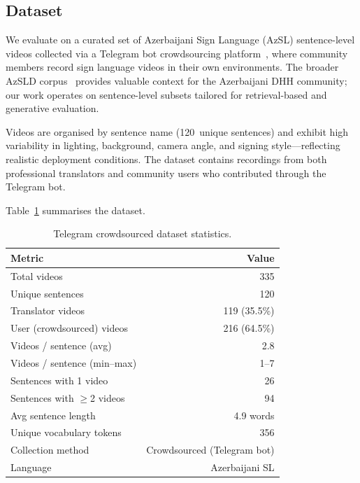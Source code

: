 \documentclass[runningheads]{llncs}
\begin{document}
\subsection{Dataset}\label{sec:dataset}

We evaluate on a curated set of Azerbaijani Sign Language (AzSL)
sentence-level videos collected via a Telegram bot crowdsourcing
platform~\cite{mustafazada2025crowdsourcing}, where community
members record sign language videos in their own environments.
The broader AzSLD corpus~\cite{alishzade2024azsld} provides valuable
context for the Azerbaijani DHH community; our work operates on
sentence-level subsets tailored for retrieval-based and generative
evaluation.

Videos are organised by sentence name (120~unique sentences) and
exhibit high variability in lighting, background, camera angle, and
signing style—reflecting realistic deployment conditions.
The dataset contains recordings from both professional translators
and community users who contributed through the Telegram bot.

Table~\ref{tab:dataset} summarises the dataset.

\begin{table}[t]
\centering
\caption{Telegram crowdsourced dataset statistics.}
\label{tab:dataset}
\begin{tabular}{@{}lr@{}}
\toprule
Metric & Value \\
\midrule
Total videos                & 335 \\
Unique sentences            & 120 \\
Translator videos           & 119 (35.5\%) \\
User (crowdsourced) videos  & 216 (64.5\%) \\
Videos / sentence (avg)     & 2.8 \\
Videos / sentence (min--max)& 1--7 \\
Sentences with 1 video      & 26 \\
Sentences with $\geq$2 videos & 94 \\
Avg sentence length         & 4.9 words \\
Unique vocabulary tokens    & 356 \\
Collection method           & Crowdsourced (Telegram bot) \\
Language                    & Azerbaijani SL \\
\bottomrule
\end{tabular}
\end{table}
\end{document}

